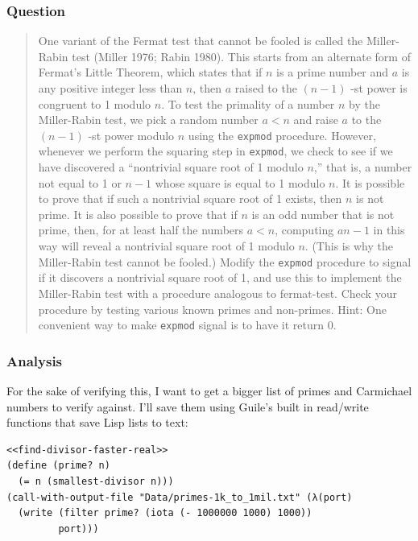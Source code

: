 \documentclass[final,fleqn,titlepage]{article}
\begin{document}
\subsubsection{Question}
\label{sec:orgdc9b489}
\begin{quote}
One variant of the Fermat test that cannot be fooled is called the Miller-Rabin
test (Miller 1976; Rabin 1980). This starts from an alternate form of Fermat’s
Little Theorem, which states that if \(n\) is a prime number and \(a\) is
any positive integer less than \(n\), then \(a\) raised to the \((n−1)\)
-st power is congruent to 1 modulo \(n\). To test the primality of a number \(n\) by the Miller-Rabin test, we pick a random number \(a<n\) and raise \(a\) to the \((n−1)\) -st power modulo \(n\) using the \texttt{expmod} procedure.
However, whenever we perform the squaring step in \texttt{expmod}, we check to see if
we have discovered a “nontrivial square root of 1 modulo \(n\),” that is, a
number not equal to 1 or \(n−1\) whose square is equal to 1 modulo \(n\). It
is possible to prove that if such a nontrivial square root of 1 exists, then \(n\) is not prime. It is also possible to prove that if \(n\) is an odd number
that is not prime, then, for at least half the numbers \(a<n\), computing \(an−1\) in this way will reveal a nontrivial square root of 1 modulo \(n\).
(This is why the Miller-Rabin test cannot be fooled.) Modify the \texttt{expmod}
procedure to signal if it discovers a nontrivial square root of 1, and use this
to implement the Miller-Rabin test with a procedure analogous to fermat-test.
Check your procedure by testing various known primes and non-primes. Hint: One
convenient way to make \texttt{expmod} signal is to have it return 0.
\end{quote}
\subsubsection{Analysis}
\label{sec:org4cde00e}
For the sake of verifying this, I want to get a bigger list of primes and
Carmichael numbers to verify against. I'll save them using Guile's built in
read/write functions that save Lisp lists to text:
\begin{verbatim}
<<find-divisor-faster-real>>
(define (prime? n)
  (= n (smallest-divisor n)))
(call-with-output-file "Data/primes-1k_to_1mil.txt" (λ(port)
  (write (filter prime? (iota (- 1000000 1000) 1000))
         port)))
\end{verbatim}
\end{document}

